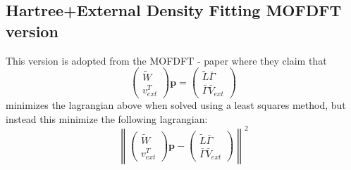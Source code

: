 \subsection{Hartree+External Density Fitting MOFDFT version}
This version is adopted from the MOFDFT - paper\cite{zhang_m-ofdft_2023} where they claim that
\begin{equation}
    \left(\begin{array}{c}\tilde{W}\\v_{ext}^T\end{array}\right) \mathbf{p} =  \left(\begin{array}{c}\tilde{L} \bar{\Gamma} \\ \bar{\Gamma}\bar{V}_{ext}\end{array}\right)
\end{equation}
minimizes the lagrangian above when solved using a least squares method, but instead this minimize the following lagrangian:
\begin{equation}
    \left\lVert
    \begin{pmatrix}
    \tilde{W} \\
    v_{ext}^T
    \end{pmatrix}
    \mathbf{p}
    -
    \begin{pmatrix}
    \tilde{L} \bar{\Gamma} \\
    \bar{\Gamma} \bar{V}_{ext}
    \end{pmatrix}
    \right\lVert^2
\end{equation}

